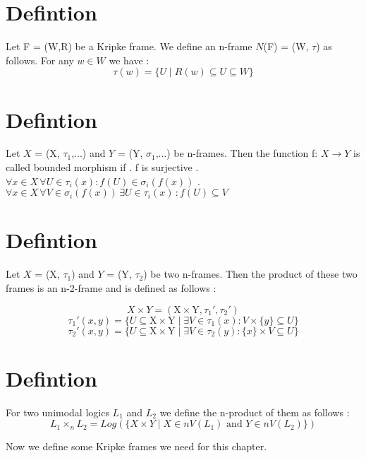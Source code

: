 \documentclass[12pt, a4paper]{scrreprt}
\begin{document}
\section{Defintion}
Let F = (W,R) be a Kripke frame. We define an n-frame $N$(F) = (W, $\tau$) as follows.
For any $w\in W$ we have :
$$\tau(w) = \{ U \mid R(w) \subseteq U \subseteq W \}$$

\section{Defintion}
Let $X$ = (X, $\tau_1$,...) and $Y$ = (Y, $\sigma_1$,...) be n-frames. Then the function f:
$X \rightarrow Y$ is called bounded morphism if \newline {}. f is surjective . $\forall x\in X \, \forall U \in \tau_i(x) : f(U) \in \sigma_i (f(x))$ . $\forall x\in X \, \forall V \in \sigma_i (f(x)) \, \exists U \in \tau_i(x) \, : f(U) \subseteq V$

\section {Defintion}
Let $X$ = (X, $\tau_1$) and $Y$ = (Y, $\tau_2$) be two n-frames. Then the product of these two frames
is an n-2-frame and is defined as follows : \newline

$$ X \times Y = (\mbox{X} \times \mbox{Y}, \tau_1', \tau_2')$$   
$$ \tau_1'(x,y) = \{ U \subseteq \mbox{X} \times \mbox{Y} \mid \exists V \in \tau_1(x) : V \times  \{ y \} \subseteq U \}$$
$$ \tau_2'(x,y) = \{ U \subseteq \mbox{X} \times \mbox{Y} \mid \exists V \in \tau_2(y) : \{ x \} \times V \subseteq U \}$$

\section {Defintion}

For two unimodal logics $L_1$ and $L_2$ we define the n-product of them as follows :
$$ L_1 \times_n L_2 = Log(\{ X \times Y \mid X \in nV(L_1) \mbox{ and } Y \in nV(L_2) \})$$

Now we define some Kripke frames we need for this chapter.
\end{document}
